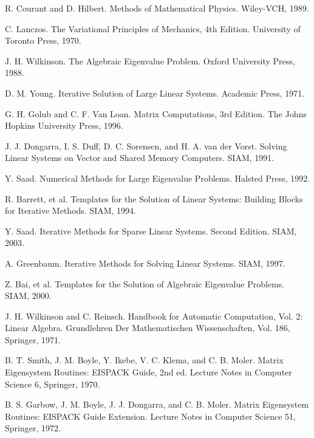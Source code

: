 \documentclass[a4paper]{article}
\begin{document}
\begin{thebibliography}{10}
R. Courant and D. Hilbert.
\newblock Methods of Mathematical Physics. 
\newblock Wiley-VCH, 1989.

C. Lanczos. 
\newblock The Variational Principles of Mechanics, 4th Edition. 
\newblock University of Toronto Press, 1970.

J. H. Wilkinson. 
\newblock The Algebraic Eigenvalue Problem. 
\newblock Oxford University Press, 1988.

D. M. Young. 
\newblock Iterative Solution of Large Linear Systems. 
\newblock Academic Press, 1971.

G. H. Golub and C. F. Van Loan.
\newblock Matrix Computations, 3rd Edition.
\newblock The Johns Hopkins University Press, 1996.

J. J. Dongarra, I. S. Duff, D. C. Sorensen, and H. A. van der Vorst.
\newblock Solving Linear Systems on Vector and Shared Memory Computers.
\newblock SIAM, 1991.

Y. Saad.
\newblock Numerical Methods for Large Eigenvalue Problems. 
\newblock Halsted Press, 1992.

R. Barrett, et al.
\newblock Templates for the Solution of Linear Systems: Building Blocks for Iterative Methods.
\newblock SIAM, 1994.

Y. Saad.
\newblock Iterative Methods for Sparse Linear Systems. Second Edition. 
\newblock SIAM, 2003.

A. Greenbaum.
\newblock Iterative Methods for Solving Linear Systems.
\newblock SIAM, 1997.

Z. Bai, et al.
\newblock Templates for the Solution of Algebraic Eigenvalue Problems.
\newblock SIAM, 2000.

J. H. Wilkinson and C. Reinsch.
\newblock Handbook for Automatic Computation, Vol. 2: Linear Algebra.
\newblock Grundlehren Der Mathematischen Wissenschaften, Vol. 186, Springer, 1971.

B. T. Smith, J. M. Boyle, Y. Ikebe, V. C. Klema, and C. B. Moler.
\newblock Matrix Eigensystem Routines: EISPACK Guide, 2nd ed.
\newblock Lecture Notes in Computer Science 6, Springer, 1970.

B. S. Garbow, J. M. Boyle, J. J. Dongarra, and C. B. Moler.
\newblock Matrix Eigensystem Routines: EISPACK Guide Extension.
\newblock Lecture Notes in Computer Science 51, Springer, 1972.


\end{thebibliography}
\end{document}
